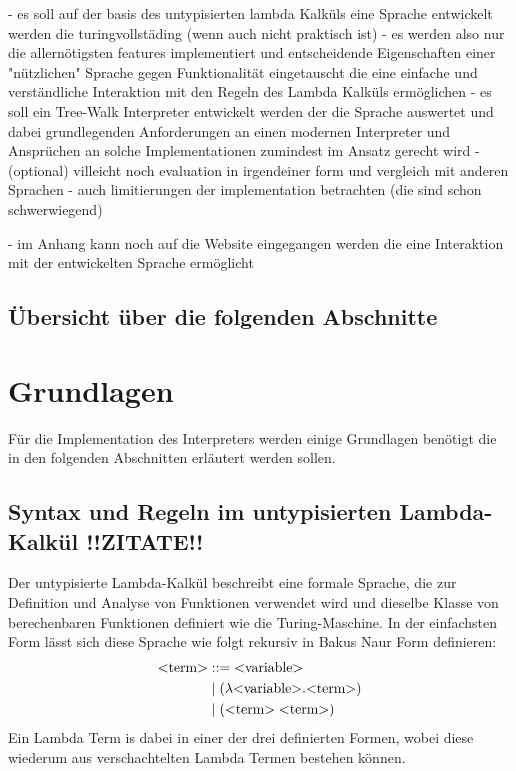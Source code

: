 \documentclass[ngerman]{article}
\begin{document}
- es soll auf der basis des untypisierten lambda Kalküls eine Sprache entwickelt werden die turingvollstäding (wenn auch nicht praktisch ist)
    - es werden also nur die allernötigsten features implementiert und entscheidende Eigenschaften einer "nützlichen" Sprache gegen Funktionalität eingetauscht die eine einfache und verständliche Interaktion mit den Regeln des Lambda Kalküls ermöglichen
- es soll ein Tree-Walk Interpreter entwickelt werden der die Sprache auswertet und dabei grundlegenden Anforderungen an einen modernen Interpreter und Ansprüchen an solche Implementationen zumindest im Ansatz gerecht wird 
- (optional) villeicht noch evaluation in irgendeiner form und vergleich mit anderen Sprachen 
- auch limitierungen der implementation betrachten (die sind schon schwerwiegend)

- im Anhang kann noch auf die Website eingegangen werden die eine Interaktion mit der entwickelten Sprache ermöglicht

\subsection{Übersicht über die folgenden Abschnitte}

\section{Grundlagen}

Für die Implementation des Interpreters werden einige Grundlagen benötigt die in den folgenden Abschnitten erläutert werden sollen.

\subsection{Syntax und Regeln im untypisierten Lambda-Kalkül !!ZITATE!!}

Der untypisierte Lambda-Kalkül beschreibt eine formale Sprache, die zur Definition und Analyse von Funktionen verwendet wird und dieselbe Klasse von berechenbaren Funktionen definiert wie die Turing-Maschine.
In der einfachsten Form lässt sich diese Sprache wie folgt rekursiv in Bakus Naur Form definieren:
\begin{align*}
    \text{\textless term\textgreater} & ::= \text{\textless variable\textgreater} \\
                      & \; | \; ( \lambda \text{\textless variable\textgreater} . \text{\textless term\textgreater} )\\
                      & \; | \; (\text{\textless term\textgreater} \; \text{\textless term\textgreater})
\end{align*}
Ein Lambda Term is dabei in einer der drei definierten Formen, wobei diese wiederum aus verschachtelten Lambda Termen bestehen können.
\end{document}
